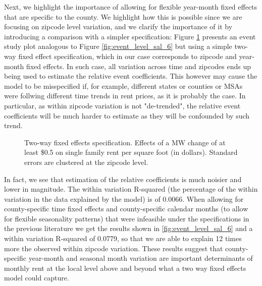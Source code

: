 Next, we highlight the importance of allowing for flexible year-month fixed effects that are specific to the county. We highlight how this is possible since we are focusing on zipcode level variation, and we clarify the importance of it by introducing a comparison with a simpler specification: Figure \ref{fig:event_level_2way} presents an event study plot analogous to Figure \ref{fig:event_level_sal_6} but using a simple two-way fixed effect specification, which in our case corresponds to zipcode and year-month fixed effects. In such case, all variation across time and zipcodes ends up being used to estimate the relative event coefficients. This however may cause the model to be misspecified if, for example, different states or counties or MSAs were follwing different time trends in rent prices, as it is probably the case. In particular, as within zipcode variation is not "de-trended", the relative event coefficients will be much harder to estimate as they will be confounded by such trend. \\

\begin{figure}[h!]
    \centering
    \caption{Two-way fixed effects specification. Effects of a MW change of at least \$0.5 on single family rent per square foot (in dollars). Standard errors are clustered at the zipcode level.}
    \label{fig:event_level_2way}
\end{figure}

In fact, we see that estimation of the relative coefficients is much noisier and lower in magnitude. The within variation R-squared (the percentage of the within variation in the data explained by the model) is of 0.0066. When allowing for county-specific time fixed effects and county-specific calendar months (to allow for flexible seasonality patterns) that were infeasible under the specifications in the previous literature we get the results shown in \ref{fig:event_level_sal_6} and a within variation R-squared of 0.0779, so that we are able to explain 12 times more the observed within zipcode variation. These results suggest that county-specific year-month and seasonal month variation are important determinants of monthly rent at the local level above and beyond what a two way fixed effects model could capture.

